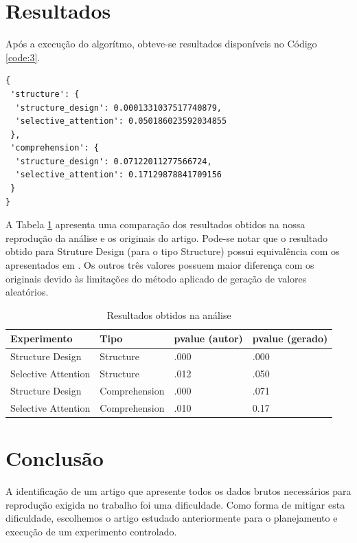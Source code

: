 \documentclass[12pt]{article}
\begin{document}
\section{Resultados}

Após a execução do algorítmo, obteve-se resultados disponíveis no Código \ref{code:3}.

\begin{lstlisting}[caption={Saída do script},captionpos=b,frame=single,label={code:3}]
{
 'structure': {
  'structure_design': 0.0001331037517740879,
  'selective_attention': 0.050186023592034855
 },
 'comprehension': {
  'structure_design': 0.07122011277566724,
  'selective_attention': 0.17129878841709156
 }
}
\end{lstlisting}

A Tabela \ref{tab:resultados} apresenta uma comparação dos resultados obtidos na nossa reprodução da análise e os originais do artigo. Pode-se notar que o resultado obtido para Struture Design (para o tipo Structure) possui equivalência com os apresentados em \cite{JIN2013248}. Os outros três valores possuem maior diferença com os originais devido às limitações do método aplicado de geração de valores aleatórios.

\begin{table}[!htb]
  \centering
	\begin{tabular}{|l|l|l|l|}
		\hline
		\textbf{Experimento} & \textbf{Tipo} & \textbf{pvalue (autor)} & \textbf{pvalue (gerado)} \\ \hline
		Structure Design & Structure & .000 & .000 \\ \hline
		Selective Attention & Structure & .012 & .050 \\ \hline
		Structure Design & Comprehension & .000 & .071 \\ \hline
		Selective Attention & Comprehension & .010 & 0.17 \\ \hline
		\end{tabular}
  \caption{Resultados obtidos na análise}
  \label{tab:resultados}
\end{table}

\section{Conclusão}

A identificação de um artigo que apresente todos os dados brutos necessários para reprodução exigida no trabalho foi uma dificuldade. Como forma de mitigar esta dificuldade, escolhemos o artigo estudado anteriormente para o planejamento e execução de um experimento controlado.
\end{document}
